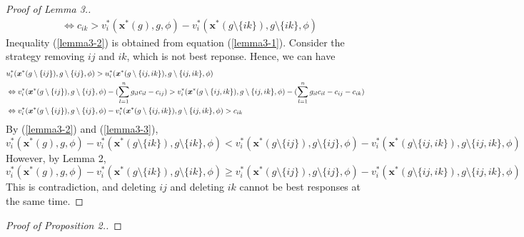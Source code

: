 \documentclass[12pt]{article}
\theoremstyle{definition}
\begin{document}
\begin{proof}[Proof of Lemma 3.]
\begin{align}
			& \Leftrightarrow c_{ik} > v_i^*(\bm{x}^*(g), g, \phi) - v_i^*(\bm{x}^*(g \setminus \{ik\}), g \setminus \{ik\}, \phi)
	\end{align}
	Inequality (\ref{lemma3-2}) is obtained from equation (\ref{lemma3-1}).
	Consider the strategy removing $ij$ and $ik$, which is not best reponse.
	Hence, we can have
	\begin{align}
		\label{lemma3-3}
		& u_i^*(\bm{x}^*(g \setminus \{ij\}), g \setminus \{ij\}, \phi) > u_i^*(\bm{x}^*(g \setminus \{ij,ik\}), g \setminus \{ij,ik\}, \phi) \notag \\
			& \Leftrightarrow v_i^*(\bm{x}^*(g \setminus \{ij\}), g \setminus \{ij\}, \phi) - (\sum_{l=1}^n g_{il} c_{il} - c_{ij}) > v_i^*(\bm{x}^*(g \setminus \{ij,ik\}), g \setminus \{ij,ik\}, \phi) - (\sum_{l=1}^n g_{il} c_{il} - c_{ij} - c_{ik}) \notag \\
			& \Leftrightarrow v_i^*(\bm{x}^*(g \setminus \{ij\}), g \setminus \{ij\}, \phi) - v_i^*(\bm{x}^*(g \setminus \{ij,ik\}), g \setminus \{ij,ik\}, \phi) > c_{ik}
	\end{align}
	By (\ref{lemma3-2}) and (\ref{lemma3-3}),
	\[ v_i^*(\bm{x}^*(g), g, \phi) - v_i^*(\bm{x}^*(g \setminus \{ik\}), g \setminus \{ik\}, \phi) < v_i^*(\bm{x}^*(g \setminus \{ij\}), g \setminus \{ij\}, \phi) - v_i^*(\bm{x}^*(g \setminus \{ij,ik\}), g \setminus \{ij,ik\}, \phi) \]
	However, by Lemma 2,
	\[ v_i^*(\bm{x}^*(g), g, \phi) - v_i^*(\bm{x}^*(g \setminus \{ik\}), g \setminus \{ik\}, \phi) \ge v_i^*(\bm{x}^*(g \setminus \{ij\}), g \setminus \{ij\}, \phi) - v_i^*(\bm{x}^*(g \setminus \{ij,ik\}), g \setminus \{ij,ik\}, \phi) \]
	This is contradiction, and deleting $ij$ and deleting $ik$ cannot be best responses at the same time.
\end{proof}

\begin{proof}[Proof of Proposition 2.]
\end{proof}
\end{document}

